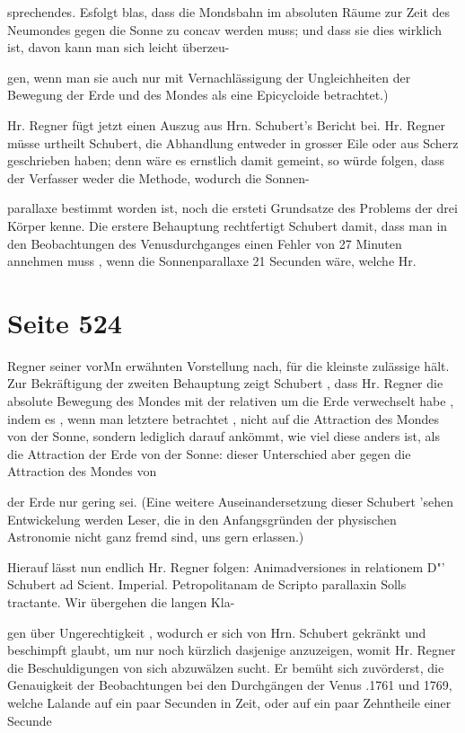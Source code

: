 \documentclass[10pt,a4paper]{article}
\begin{document}
sprechendes. Esfolgt blas, dass die Mondsbahn im absoluten Räume zur Zeit des Neumondes gegen die Sonne zu concav werden muss; und dass sie dies wirklich ist, davon kann man sich leicht überzeu-

gen, wenn man sie auch nur mit Vernachlässigung der Ungleichheiten der Bewegung der Erde und des Mondes als eine Epicycloide betrachtet.)

Hr. Regner fügt jetzt einen Auszug aus Hrn. Schubert's Bericht bei. Hr. Regner müsse urtheilt Schubert, die Abhandlung entweder in grosser Eile oder aus Scherz geschrieben haben; denn wäre es ernstlich damit gemeint, so würde folgen, dass der Verfasser weder die Methode, wodurch die Sonnen-

parallaxe bestimmt worden ist, noch die ersteti Grundsatze des Problems der drei Körper kenne. Die erstere Behauptung rechtfertigt Schubert damit, dass man in den Beobachtungen des Venusdurchganges einen Fehler von 27 Minuten annehmen muss , wenn die Sonnenparallaxe 21 Secunden wäre, welche Hr.


\newpage
\section*{Seite 524}
Regner seiner vorMn erwähnten Vorstellung nach, für die kleinste zulässige hält. Zur Bekräftigung der zweiten Behauptung zeigt Schubert , dass Hr. Regner die absolute Bewegung des Mondes mit der relativen um die Erde verwechselt habe , indem es , wenn man letztere betrachtet , nicht auf die Attraction des Mondes von der Sonne, sondern lediglich darauf ankömmt, wie viel diese anders ist, als die Attraction der Erde von der Sonne: dieser Unterschied aber gegen die Attraction des Mondes von

der Erde nur gering sei. (Eine weitere Auseinandersetzung dieser Schubert 'sehen Entwickelung werden Leser, die in den Anfangsgründen der physischen Astronomie nicht ganz fremd sind, uns gern erlassen.)

Hierauf lässt nun endlich Hr. Regner folgen: Animadversiones in relationem D"' Schubert ad Scient. Imperial. Petropolitanam de Scripto parallaxin Solls tractante. Wir übergehen die langen Kla-

gen über Ungerechtigkeit , wodurch er sich von Hrn. Schubert gekränkt und beschimpft glaubt, um nur noch kürzlich dasjenige anzuzeigen, womit Hr. Regner die Beschuldigungen von sich abzuwälzen sucht. Er bemüht sich zuvörderst, die Genauigkeit der Beobachtungen bei den Durchgängen der Venus .1761 und 1769, welche Lalande auf ein paar Secunden in Zeit, oder auf ein paar Zehntheile einer Secunde
\end{document}
